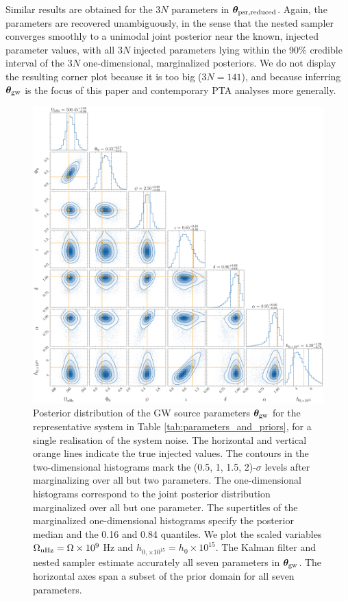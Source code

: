 \documentclass[fleqn,usenatbib,useAMS]{mnras}
\begin{document}
Similar results are obtained for the 3$N$ parameters in $\boldsymbol{\theta}_{\rm psr, reduced}$. Again, the parameters are recovered unambiguously, in the sense that the nested sampler converges smoothly to a unimodal joint posterior near the known, injected parameter values, with all $3N$ injected parameters lying within the 90\% credible interval of the $3N$ one-dimensional, marginalized posteriors. We do not display the resulting corner plot because it is too big ($3N = 141$), and because inferring ${\boldsymbol{\theta}}_{\rm gw}$ is the focus of this paper and contemporary PTA analyses more generally.

 
 
\begin{figure}
	\includegraphics[width=\textwidth, height =\textwidth ]{images/small_h_posterior_10}
	\caption{Posterior distribution of the GW source parameters $\boldsymbol{\theta}_{\rm gw}$ for the representative system in Table \ref{tab:parameters_and_priors}, for a single realisation of the system noise. The horizontal and vertical orange lines indicate the true injected values. The contours in the two-dimensional histograms mark the (0.5, 1, 1.5, 2)-$\sigma$ levels after marginalizing over all but two parameters. The one-dimensional histograms correspond to the joint posterior distribution marginalized over all but one parameter. The supertitles of the marginalized one-dimensional histograms specify the posterior median and the 0.16 and 0.84 quantiles. We plot the scaled variables $\Omega_{\rm nHz} = \Omega \times 10^{9}$ Hz and $h_{0, \times 10^{15}} = h_0 \times 10^{15}$. The Kalman filter and nested sampler estimate accurately all seven parameters in ${\boldsymbol{\theta}}_{\rm gw}$. The horizontal axes span a subset of the prior domain for all seven parameters.}
	\label{fig:corner_plot_1}
\end{figure}
\end{document}

